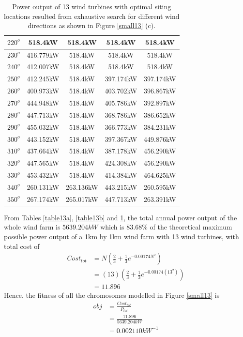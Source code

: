 \begin{table}[H]
\begin{tabular}{|c|c|c|c|c|}
        		$220^o$	& 518.4kW	& 518.4kW	& 518.4kW	& 518.4kW	\\ \hline
        		$230^o$	& 416.779kW	& 518.4kW	& 518.4kW	& 518.4kW	\\ \hline
        		$240^o$	& 412.007kW	& 518.4kW	& 518.4kW	& 518.4kW	\\ \hline
        		$250^o$	& 412.245kW	& 518.4kW	& 397.174kW	& 397.174kW	\\ \hline
        		$260^o$	& 400.973kW	& 518.4kW	& 403.702kW	& 396.867kW	\\ \hline
        		$270^o$	& 444.948kW	& 518.4kW	& 405.786kW	& 392.897kW	\\ \hline
        		$280^o$	& 447.713kW	& 518.4kW	& 368.786kW	& 386.652kW	\\ \hline
        		$290^o$	& 455.032kW	& 518.4kW	& 366.773kW	& 384.231kW	\\ \hline
        		$300^o$	& 443.152kW	& 518.4kW	& 397.367kW	& 449.876kW	\\ \hline
        		$310^o$	& 437.664kW	& 518.4kW	& 387.178kW	& 456.290kW	\\ \hline
        		$320^o$	& 447.565kW	& 518.4kW	& 424.308kW	& 456.290kW	\\ \hline
        		$330^o$	& 453.432kW	& 518.4kW	& 414.384kW	& 464.625kW	\\ \hline
        		$340^o$	& 260.131kW	& 263.136kW	& 443.215kW	& 260.595kW	\\ \hline
        		$350^o$	& 267.174kW	& 265.017kW	& 447.713kW	& 263.391kW	\\ \hline
        	\end{tabular}
        	\caption{Power output of 13 wind turbines with optimal siting locations resulted from exhaustive search for different wind directions as shown in Figure \ref{small13} (c).}
        	\label{table13c}
        \end{table}
        \doublespacing
        
        From Tables \ref{table13a}, \ref{table13b} and \ref{table13c}, the total annual power output of the whole wind farm is $5639.204kW$ which is $83.68\%$ of the theoretical maximum possible power output of a 1km by 1km wind farm with 13 wind turbines, with total cost of
        \begin{align*}
            Cost_{tot}
            &= N\left(\frac{2}{3} + \frac{1}{3}e^{-0.00174N^2}\right) \\
            &= \left(13\right)\left(\frac{2}{3} + \frac{1}{3}e^{-0.00174\left(13^2\right)}\right) \\
            &=11.896
        \end{align*}
        Hence, the fitness of all the chromosomes modelled in Figure \ref{small13} is
        \begin{align*}
            obj
            &=\frac{Cost_{tot}}{P_{tot}} \\
            &=\frac{11.896}{5639.204kW} \\
            &=0.002110kW^{-1}
        \end{align*} 
        

